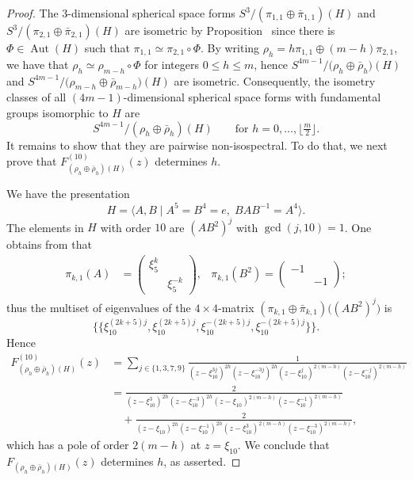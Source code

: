 \documentclass[12pt,a4paper,final]{amsart}
\theoremstyle{plain}
\theoremstyle{definition}
\theoremstyle{remark}
\numberwithin{equation}{section}
\newcommand{\op}{\operatorname}
\begin{document}
\begin{proof}
The $3$-dimensional spherical space forms 
$S^{3}/(\pi_{1,1}\oplus\bar\pi_{1,1}) (H)$ and $S^{3}/(\pi_{2,1}\oplus\bar\pi_{2,1}) (H)$ are isometric by Proposition~\cite[Prop.~5.3]{Wolf01} since there is $\Phi\in\op{Aut}(H)$ such that $\pi_{1,1}\simeq\pi_{2,1}\circ\Phi$. 
By writing $\rho_h=h\pi_{1,1}\oplus(m-h)\pi_{2,1}$, we have that $\rho_h\simeq \rho_{m-h}\circ\Phi$ for integers $0\leq h\leq m$, 
hence 
$
S^{4m-1}/\big(\rho_h\oplus\bar\rho_h\big)(H)
$
and 
$
S^{4m-1}/\big(\rho_{m-h}\oplus\bar\rho_{m-h}\big)(H)
$
are isometric. 
Consequently, the isometry classes of all $(4m-1)$-dimensional spherical space forms with fundamental groups isomorphic to $H$ are 
\begin{equation}\label{eq:S^4m-1/rho_h(H)}
S^{4m-1}/(\rho_h\oplus\bar\rho_h)(H)
\qquad\text{for }h=0,\dots,\lfloor\tfrac{m}{2}\rfloor. 
\end{equation}
It remains to show that they are pairwise non-isospectral. 
To do that, we next prove that $F_{(\rho_h\oplus\bar\rho_h)(H)}^{(10)}(z)$ determines $h$. 

We have the presentation
\begin{equation}
H=\langle A,B\mid A^5=B^4=e,\; BAB^{-1}=A^4\rangle.
\end{equation}
The elements in $H$ with order $10$ are $(AB^2)^j$ with $\gcd(j,10)=1$. 
One obtains from \cite[(4.1)]{Wolf01} that 
\begin{align}
\pi_{k,1}(A)&=
\begin{pmatrix}
\xi_5^{k}&\\ & \xi_5^{-k}
\end{pmatrix}
,&
\pi_{k,1}(B^2)=
\begin{pmatrix}
-1&\\ & -1
\end{pmatrix}
;
\end{align}
thus the multiset of eigenvalues of the $4\times4$-matrix $(\pi_{k,1}\oplus \bar\pi_{k,1})\big((AB^2)^j\big)$ is  \begin{equation}
\{\!\{\xi_{10}^{(2k+5)j},\xi_{10}^{(2k+5)j}, \xi_{10}^{-(2k+5)j}, \xi_{10}^{-(2k+5)j}\}\!\}
. 
\end{equation}
Hence
\begin{equation}
\begin{aligned}
F_{(\rho_h\oplus\bar\rho_h)(H)}^{(10)}(z)&
= \sum_{j\in\{1,3,7,9\}} \frac{1}{ 
	(z-\xi_{10}^{3j})^{2h} 
	(z-\xi_{10}^{-3j})^{2h} 
	(z-\xi_{10}^{j})^{2(m-h)}
	(z-\xi_{10}^{-j})^{2(m-h)}
}
\\ & 
= \frac{2}{ 
	(z-\xi_{10}^{3})^{2h} 
	(z-\xi_{10}^{-3})^{2h} 
	(z-\xi_{10})^{2(m-h)}
	(z-\xi_{10}^{-1})^{2(m-h)}
}
\\&\quad 
+
\frac{2}{ 
	(z-\xi_{10})^{2h} 
	(z-\xi_{10}^{-1})^{2h} 
	(z-\xi_{10}^{3})^{2(m-h)}
	(z-\xi_{10}^{-3})^{2(m-h)}
}
,
\end{aligned}
\end{equation}
which has a pole of order $2(m-h)$ at $z=\xi_{10}$. 
We conclude that $F_{(\rho_h\oplus\bar\rho_h)(H)}(z)$ determines $h$, as asserted. 



\end{proof}
\end{document}
